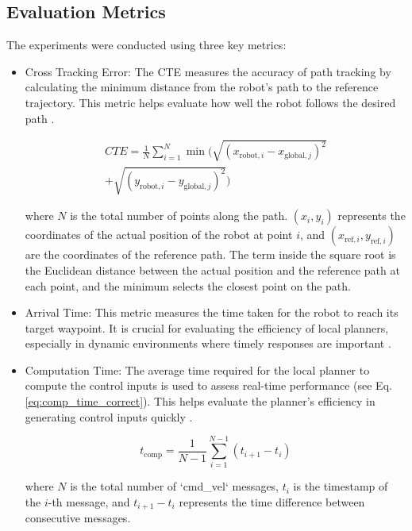 \documentclass[conference]{IEEEtran}
\begin{document}
\subsection{Evaluation Metrics}

The experiments were conducted using three key metrics:

\begin{itemize}
    \item Cross Tracking Error: The CTE measures the accuracy of path tracking by calculating the minimum distance from the robot's path to the reference trajectory. This metric helps evaluate how well the robot follows the desired path \cite{gonzalez2015review}.
    
    \begin{multline}
    CTE = \frac{1}{N} \sum_{i=1}^{N} \min \Bigg( \sqrt{(x_{\text{robot}, i} - x_{\text{global}, j})^2} \\
    + \sqrt{(y_{\text{robot}, i} - y_{\text{global}, j})^2} \Bigg)
    \label{eq:CTE}
    \end{multline}
    
    where \( N \) is the total number of points along the path. \( (x_i, y_i) \) represents the coordinates of the actual position of the robot at point \(i\), and \( (x_{\text{ref},i}, y_{\text{ref},i}) \) are the coordinates of the reference path. The term inside the square root is the Euclidean distance between the actual position and the reference path at each point, and the minimum selects the closest point on the path.

    \item Arrival Time: This metric measures the time taken for the robot to reach its target waypoint. It is crucial for evaluating the efficiency of local planners, especially in dynamic environments where timely responses are important \cite{werling2012optimal}.
    
    \item Computation Time: The average time required for the local planner to compute the control inputs is used to assess real-time performance (see Eq. \ref{eq:comp_time_correct}). This helps evaluate the planner's efficiency in generating control inputs quickly \cite{nielsen2020real}.
    
    \begin{equation}
    t_{\text{comp}} = \frac{1}{N-1} \sum_{i=1}^{N-1} (t_{i+1} - t_i)
    \label{eq:comp_time_correct}
    \end{equation}
    
    where \( N \) is the total number of `cmd\_vel` messages, \( t_i \) is the timestamp of the \( i \)-th message, and \( t_{i+1} - t_i \) represents the time difference between consecutive messages.
\end{itemize}
\end{document}
